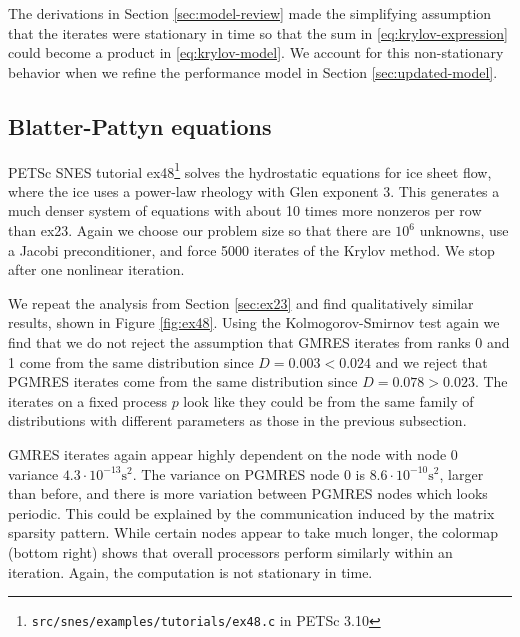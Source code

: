 \documentclass[sigconf]{acmart}
\begin{document}
The derivations in Section \ref{sec:model-review} made the simplifying assumption that the iterates were stationary in time so that the sum in \eqref{eq:krylov-expression} could become a product in \eqref{eq:krylov-model}. We account for this non-stationary behavior when we refine the performance model in Section \ref{sec:updated-model}.



\subsection{Blatter-Pattyn equations}
PETSc SNES tutorial ex48\footnote{\texttt{src/snes/examples/tutorials/ex48.c} in PETSc 3.10} solves the hydrostatic equations for ice sheet flow, where the ice uses a power-law rheology with Glen exponent 3. This generates a much denser system of equations with about 10 times more nonzeros per row than ex23. Again we choose our problem size so that there are $10^6$ unknowns, use a Jacobi preconditioner, and force 5000 iterates of the Krylov method. We stop after one nonlinear iteration. 

We repeat the analysis from Section \ref{sec:ex23} and find qualitatively similar results, shown in Figure \ref{fig:ex48}. Using the Kolmogorov-Smirnov test again we find that we do not reject the assumption that GMRES iterates from ranks 0 and 1 come from the same distribution since $D = 0.003 < 0.024$ and we reject that PGMRES iterates come from the same distribution since $D = 0.078 > 0.023$.
The iterates on a fixed process $p$ look like they could be from the same family of distributions with different parameters as those in the previous subsection. 

GMRES iterates again appear highly dependent on the node with node 0 variance $4.3\cdot10^{-13} \text{s}^2$. The variance on PGMRES node 0 is $8.6\cdot10^{-10} \text{s}^2$, larger than before, and there is more variation between PGMRES nodes which looks periodic. This could be explained by the communication induced by the matrix sparsity pattern. While certain nodes appear to take much longer, the colormap (bottom right) shows that overall processors perform similarly within an iteration. Again, the computation is  not stationary in time. 
\end{document}
